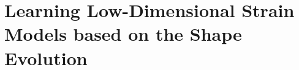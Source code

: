 \chapter{Learning Low-Dimensional Strain Models based on the Shape Evolution}
\label{chp:pcsregression}

\begin{foreword}

\end{foreword}
